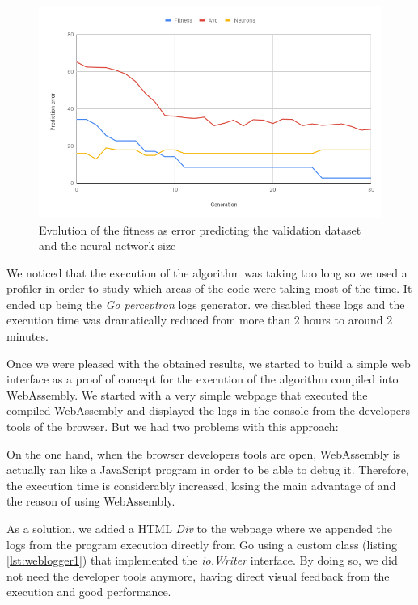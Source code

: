 \begin{figure}[h!]
		\centering
    	\includegraphics[width=\linewidth]{assets/images/milestone1-native-chart.png}
    	\caption{Evolution of the fitness as error predicting the validation dataset and the neural network size}
    	\label{fig:native}
\end{figure} 

We noticed that the execution of the algorithm was taking too long so we used a profiler in order to study which areas of the code were taking most of the time. It ended up being the \textit{Go perceptron} logs generator. we disabled these logs and the execution time was dramatically reduced from more than 2 hours to around 2 minutes.

Once we were pleased with the obtained results, we started to build a simple web interface as a proof of concept for the execution of the algorithm compiled into WebAssembly. We started with a very simple webpage that executed the compiled WebAssembly and displayed the logs in the console from the developers tools of the browser. But we had two problems with this approach:

On the one hand, when the browser developers tools are open, WebAssembly is actually ran like a JavaScript program in order to be able to debug it. Therefore, the execution time is considerably increased, losing the main advantage of and the reason of using WebAssembly.

As a solution, we added a HTML \textit{Div} to the webpage where we appended the logs from the program execution directly from Go using a custom class (listing \ref{lst:weblogger1}) that implemented the \textit{io.Writer} interface. By doing so, we did not need the developer tools anymore, having direct visual feedback from the execution and good performance.

